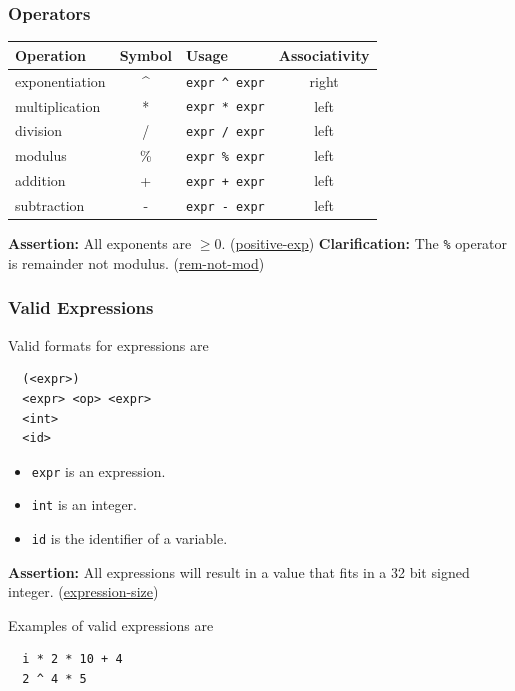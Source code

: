 \documentclass{article}
\newcommand{\code}[1]{\texttt{\textmd{#1}}}
\newcommand{\assertion}[2]{\textbf{Assertion: }#1 (\hyperlink{#2}{#2})}
\newcommand{\clarification}[2]{\textbf{Clarification: }#1 (\hyperlink{#2}{#2})}
\begin{document}
\subsubsection{Operators}
\begin{center}
  \begin{tabular}{|l|c|l|c|}
    \hline
    \textbf{Operation} & \textbf{Symbol} & \textbf{Usage} &
    \textbf{Associativity} \\
    \hline
    exponentiation & \textasciicircum & \code{expr \textasciicircum\ expr} & right\\
    multiplication & *  & \code{expr * expr}  & left \\
    division       & /  & \code{expr / expr}  & left \\
    modulus        & \% & \code{expr \% expr}  & left \\
    addition       & +  & \code{expr + expr}  & left \\
    subtraction    & -  & \code{expr - expr}  & left \\
    \hline
  \end{tabular}
\end{center}

\assertion{All exponents are $\geq 0$.}{positive-exp}
\clarification{The \code{\%} operator is remainder not modulus.}{rem-not-mod}

\subsubsection{Valid Expressions}
Valid formats for expressions are
\begin{lstlisting}
  (<expr>)
  <expr> <op> <expr>
  <int>
  <id>
\end{lstlisting}

\begin{itemize}
  \item \code{expr} is an expression.
  \item \code{int} is an integer.
  \item \code{id} is the identifier of a variable.
\end{itemize}

\assertion{All expressions will result in a value that fits in a 32 bit signed integer.}
{expression-size}

Examples of valid expressions are
\begin{lstlisting}
  i * 2 * 10 + 4
  2 ^ 4 * 5
\end{lstlisting}
\end{document}
